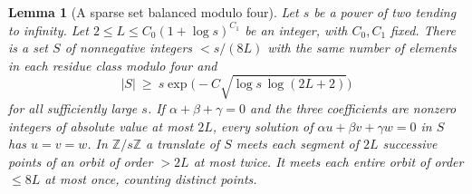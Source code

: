 \documentclass[a4paper,11pt]{article}
\newtheorem{lemma}[proposition]{Lemma}
\theoremstyle{definition}
\theoremstyle{remark}
\newcommand{\ZZ}{\mathbb Z}\newcommand{\ord}{\operatorname{ord}}
\numberwithin{equation}{section}
\begin{document}
\begin{lemma}[A sparse set balanced modulo four]\label{lem:sphere48}
Let \(s\) be a power of two tending to infinity. Let
\(2\le L\le C_0(1+\log s)^{C_1}\) be an integer, with \(C_0,C_1\)
fixed. There is a set \(S\) of nonnegative integers \(<s/(8L)\)
with the same number of elements in each residue class modulo four and
\[
 |S|\ \ge\ s\exp\bigl(-C\sqrt{\log s\,\log(2L+2)}\bigr)
\]
for all sufficiently large \(s\). If
\(\alpha+\beta+\gamma=0\) and the three coefficients are nonzero
integers of absolute value at most \(2L\), every solution of
\(\alpha u+\beta v+\gamma w=0\) in \(S\) has \(u=v=w\).
In \(\ZZ/s\ZZ\) a translate of \(S\) meets each segment of \(2L\)
successive points of an orbit of order \(>2L\) at most twice. It meets
each entire orbit of order \(\le8L\) at most once, counting distinct
points.
\end{lemma}
\end{document}
